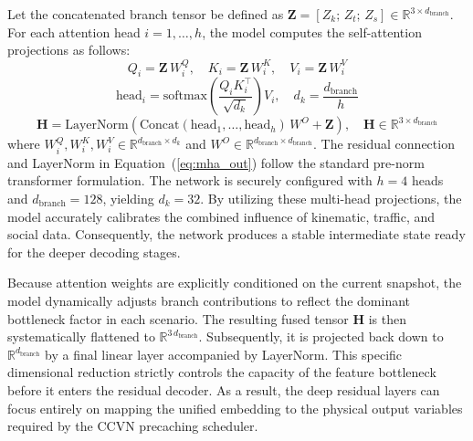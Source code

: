 \documentclass[journal]{IEEEtran}
\begin{document}
Let the concatenated branch tensor be defined as $\mathbf{Z} = [Z_k;\, Z_t;\, Z_s] \in \mathbb{R}^{3 \times d_\text{branch}}$.
For each attention head $i = 1, \ldots, h$, the model computes the self-attention projections as follows:
\begin{equation}
Q_i = \mathbf{Z}\, W^Q_i,\quad K_i = \mathbf{Z}\, W^K_i,\quad V_i = \mathbf{Z}\, W^V_i
\label{eq:mha_proj}
\end{equation}
\begin{equation}
\text{head}_i = \text{softmax}\!\left(\frac{Q_i K_i^\top}{\sqrt{d_k}}\right) V_i,\quad d_k = \frac{d_\text{branch}}{h}
\label{eq:mha_head}
\end{equation}
\begin{equation}
\mathbf{H} = \text{LayerNorm}\!\left(\text{Concat}(\text{head}_1,\ldots,\text{head}_h)\, W^O + \mathbf{Z}\right), \quad \mathbf{H} \in \mathbb{R}^{3 \times d_\text{branch}}
\label{eq:mha_out}
\end{equation}
where $W^Q_i, W^K_i, W^V_i \in \mathbb{R}^{d_\text{branch} \times d_k}$ and $W^O \in \mathbb{R}^{d_\text{branch} \times d_\text{branch}}$.
The residual connection and LayerNorm in Equation~(\ref{eq:mha_out}) follow the standard pre-norm transformer formulation.
The network is securely configured with $h = 4$ heads and $d_\text{branch} = 128$, yielding $d_k = 32$.
By utilizing these multi-head projections, the model accurately calibrates the combined influence of kinematic, traffic, and social data.
Consequently, the network produces a stable intermediate state ready for the deeper decoding stages.

Because attention weights are explicitly conditioned on the current snapshot, the model dynamically adjusts branch contributions to reflect the dominant bottleneck factor in each scenario.
The resulting fused tensor $\mathbf{H}$ is then systematically flattened to $\mathbb{R}^{3\,d_\text{branch}}$.
Subsequently, it is projected back down to $\mathbb{R}^{d_\text{branch}}$ by a final linear layer accompanied by LayerNorm.
This specific dimensional reduction strictly controls the capacity of the feature bottleneck before it enters the residual decoder.
As a result, the deep residual layers can focus entirely on mapping the unified embedding to the physical output variables required by the CCVN precaching scheduler.

\end{document}
